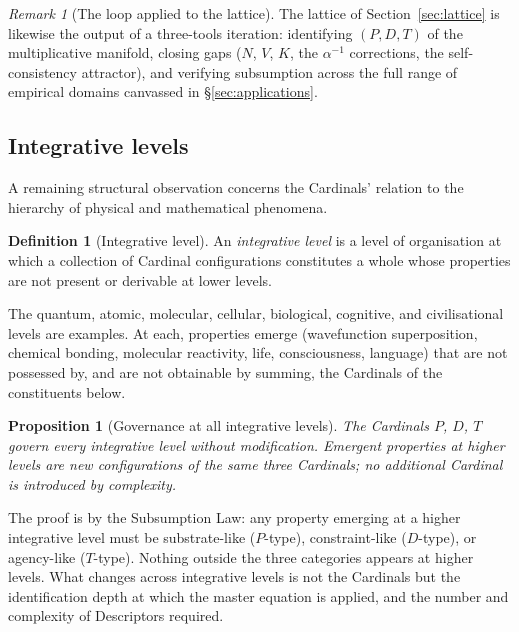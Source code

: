 \documentclass[11pt,a4paper]{article}
\newtheorem{proposition}[theorem]{Proposition}
\theoremstyle{definition}
\newtheorem{definition}[theorem]{Definition}
\theoremstyle{remark}
\newtheorem{remark}[theorem]{Remark}
\begin{document}
\begin{remark}[The loop applied to the lattice]
The lattice of Section~\ref{sec:lattice} is likewise the output of a three-tools iteration: identifying $(P,D,T)$ of the multiplicative manifold, closing gaps ($N$, $V$, $K$, the $\alpha^{-1}$ corrections, the self-consistency attractor), and verifying subsumption across the full range of empirical domains canvassed in \S\ref{sec:applications}.
\end{remark}

\subsection{Integrative levels}\label{subsec:levels}

A remaining structural observation concerns the Cardinals' relation to the hierarchy of physical and mathematical phenomena.

\begin{definition}[Integrative level]\label{def:levels}
An \emph{integrative level} is a level of organisation at which a collection of Cardinal configurations constitutes a whole whose properties are not present or derivable at lower levels.
\end{definition}

The quantum, atomic, molecular, cellular, biological, cognitive, and civilisational levels are examples. At each, properties emerge (wavefunction superposition, chemical bonding, molecular reactivity, life, consciousness, language) that are not possessed by, and are not obtainable by summing, the Cardinals of the constituents below.

\begin{proposition}[Governance at all integrative levels]\label{prop:governance}
The Cardinals $P$, $D$, $T$ govern every integrative level without modification. Emergent properties at higher levels are new configurations of the same three Cardinals; no additional Cardinal is introduced by complexity.
\end{proposition}

The proof is by the Subsumption Law: any property emerging at a higher integrative level must be substrate-like ($P$-type), constraint-like ($D$-type), or agency-like ($T$-type). Nothing outside the three categories appears at higher levels. What changes across integrative levels is not the Cardinals but the identification depth at which the master equation is applied, and the number and complexity of Descriptors required.
\end{document}
